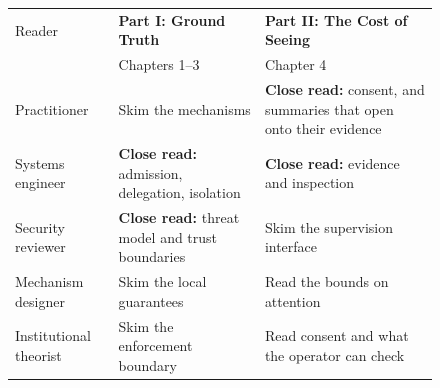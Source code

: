 \begingroup
\makeatletter\let\@xfloat\pd@orig@xfloat\makeatother
{}\label{book:reader-left}
\begin{figure}[H]
\centering
{\pdfiglabel\renewcommand{\arraystretch}{1.7}\setlength{\tabcolsep}{5pt}%
\begin{tabularx}{\linewidth}{@{}p{2.2cm}XX@{}}
\toprule
Reader & \textbf{Part I: Ground Truth} & \textbf{Part II: The Cost of Seeing}\\
 & Chapters 1--3 & Chapter 4\\
\midrule
Practitioner & Skim the mechanisms & \textbf{Close read:} consent, and summaries that open onto their evidence\\
Systems engineer & \textbf{Close read:} admission, delegation, isolation & \textbf{Close read:} evidence and inspection\\
Security reviewer & \textbf{Close read:} threat model and trust boundaries & Skim the supervision interface\\
Mechanism designer & Skim the local guarantees & Read the bounds on attention\\
Institutional theorist & Skim the enforcement boundary & Read consent and what the operator can check\\
\bottomrule
\end{tabularx}}
\end{figure}
\pdreaderleftprose
\clearpage
{}\label{book:reader-right}
